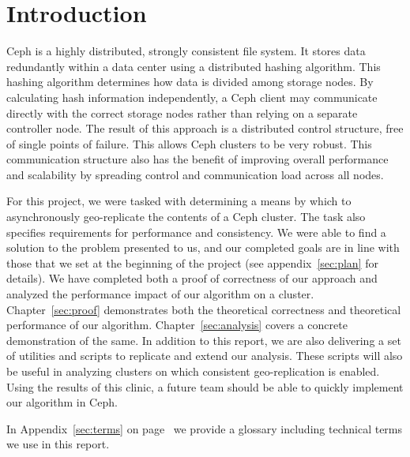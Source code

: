 \chapter{Introduction}
\label{sec:introduction}

Ceph is a highly distributed, strongly consistent file system. It
stores data redundantly within a data center using a distributed hashing
algorithm. This hashing algorithm determines how data is divided among
storage nodes.  By calculating hash information independently, a Ceph
client may communicate directly with the correct storage nodes rather
than relying on a separate controller node. The result of this
approach is a distributed control structure, free of single points of
failure. This allows Ceph clusters to be very robust. This
communication structure also has the benefit of improving overall
performance and scalability by spreading control and communication
load across all nodes.

For this project, we were tasked with determining a means by which to
asynchronously geo-replicate the contents of a Ceph cluster. The task
also specifies requirements for performance and consistency. We were
able to find a solution to the problem presented to us, and our
completed goals are in line with those that we set at the beginning of
the project (see appendix~\ref{sec:plan} for details). We have
completed both a proof of correctness of our approach and analyzed 
the performance impact of our algorithm on a cluster.
Chapter~\ref{sec:proof} demonstrates both the theoretical correctness
and theoretical performance of our
algorithm. Chapter~\ref{sec:analysis} covers a concrete demonstration
of the same. In addition to this report, we are also
delivering a set of utilities and scripts to replicate and extend our
analysis. These scripts will also be useful in analyzing clusters on 
which consistent geo-replication is enabled. Using the results of this
clinic, a future team should be able to quickly implement our
algorithm in Ceph.

In Appendix~\ref{sec:terms} on page~\pageref{sec:terms} we provide
a glossary including technical terms we use in this report.


